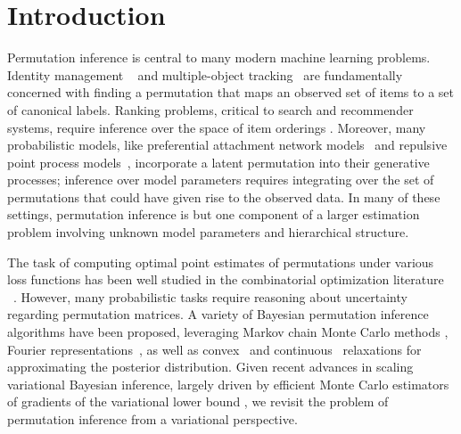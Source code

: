 \documentclass[twoside]{article}
\begin{document}
\section{Introduction}

Permutation inference is central to many modern machine learning
problems.  Identity management ~\citep{guibas2008identity} and
multiple-object tracking~\citep{shin2005lazy, kondor2007multi} are
fundamentally concerned with finding a permutation that maps an
observed set of items to a set of canonical labels.
Ranking problems, critical to search and recommender systems, require
inference over the space of item orderings \citep{meilua2007consensus,
  lebanon2008non, adams2011ranking}.  Moreover, many probabilistic models, like
preferential attachment network models~\citep{bloem2016random} and
repulsive point process models~\citep{rao2016bayesian}, incorporate a
latent permutation into their generative processes; inference over
model parameters requires integrating over the set of permutations
that could have given rise to the observed data.  In many of these
settings, permutation inference is but one component of a larger
estimation problem involving unknown model parameters and hierarchical
structure.

The task of computing optimal point estimates of permutations under
various loss functions has been well studied
in the combinatorial optimization literature ~\citep{kuhn1955hungarian, munkres1957algorithms,
  lawler1963quadratic}. However, many probabilistic tasks require reasoning
about uncertainty regarding permutation matrices.  A variety of
Bayesian permutation inference algorithms have been proposed, leveraging
Markov chain Monte Carlo methods \citep{diaconis1988group}, Fourier
representations~\citep{kondor2007multi, huang2009fourier}, as well as
convex~\citep{lim2014beyond} and
continuous~\citep{plis2011directional} relaxations for approximating
the posterior distribution.  Given recent advances in scaling
variational Bayesian inference, largely driven by efficient Monte
Carlo estimators of gradients of the variational lower bound
\citep{Kingma2014, rezende2014stochastic}, we revisit the problem of
permutation inference from a variational perspective.
\end{document}
